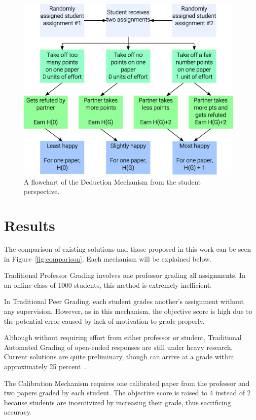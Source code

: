 \documentclass{sigchi}
\begin{document}
\begin{figure}[!h]
\centering
\includegraphics[width=0.9\columnwidth]{Deduction-Flowchart.eps}
\caption{A flowchart of the Deduction Mechanism from the student perspective.}
\label{fig:deduction}
\end{figure}

\section{Results}
The comparison of existing solutions and those proposed in this work can be seen in Figure~\ref{fig:comparison}. Each mechanism will be explained below.

Traditional Professor Grading involves one professor grading all assignments. In an online class of 1000 students, this method is extremely inefficient.

In Traditional Peer Grading, each student grades another's assignment without any supervision. However, as in this mechanism, the objective score is high due to the potential error caused by lack of motivation to grade properly.

Although without requiring effort from either professor or student, Traditional Automated Grading of open-ended responses are still under heavy research. Current solutions are quite preliminary, though can arrive at a grade within approximately 25 percent~\cite{automatedsystemssuck}.

The Calibration Mechanism requires one calibrated paper from the professor and two papers graded by each student. The objective score is raised to 4 instead of 2 because students are incentivized by increasing their grade, thus sacrificing accuracy.
\end{document}
